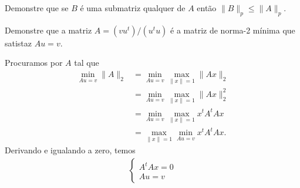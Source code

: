 \documentclass[a4paper,12pt, leqno, answers]{exam}
\begin{document}
\begin{questions}
    \question Demonstre que se $B$ \'{e} uma submatriz qualquer de $A$ ent\~{a}o $\| B \|_p \leq \| A \|_p$.
    \begin{solution}
        
    \end{solution}

    \question Demonstre que a matriz $A = (v u^t) / (u^t u)$ \'{e} a matriz de norma-2 m\'{i}nima que satistaz $A u = v$.
    \begin{solution}
        Procuramos por $A$ tal que
        \begin{align*}
            \min_{A u = v} \| A \|_2 &= \min_{A u = v} \max_{\| x \| = 1} \| A x \|_2 \\
            &= \min_{A u = v} \max_{\| x \| = 1} \| A x \|_2^2 \\
            &= \min_{A u = v} \max_{\| x \| = 1} x^t A^t A x \\
            &= \max_{\| x \| = 1} \min_{A u = v} x^t A^t A x.
        \end{align*}
        Derivando e igualando a zero, temos
        \begin{align*}
            \begin{cases}
                A^t A x = 0 \\
                A u = v
            \end{cases}
        \end{align*}
    \end{solution}
\end{questions}


\end{document}
